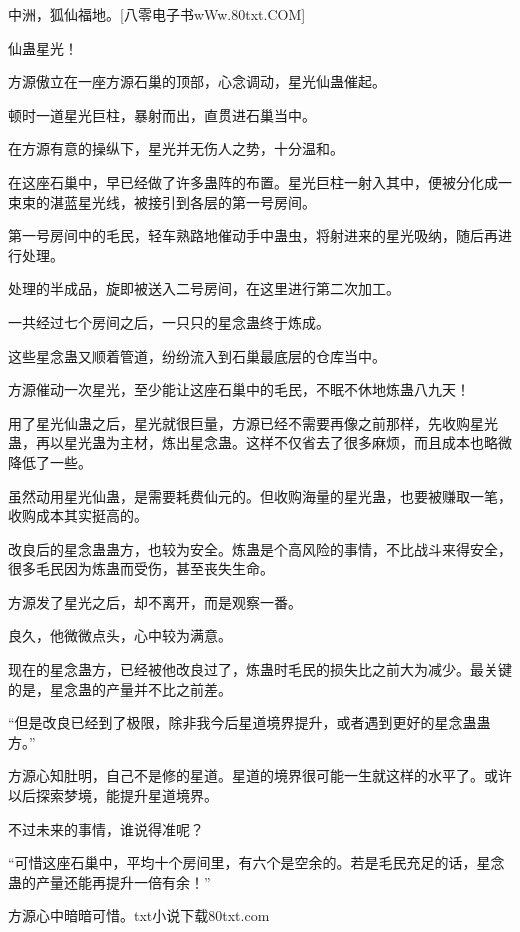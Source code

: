 
\begin{this_body}

中洲，狐仙福地。[八零电子书wWw.80txt.COM]

仙蛊星光！

方源傲立在一座方源石巢的顶部，心念调动，星光仙蛊催起。

顿时一道星光巨柱，暴射而出，直贯进石巢当中。

在方源有意的操纵下，星光并无伤人之势，十分温和。

在这座石巢中，早已经做了许多蛊阵的布置。星光巨柱一射入其中，便被分化成一束束的湛蓝星光线，被接引到各层的第一号房间。

第一号房间中的毛民，轻车熟路地催动手中蛊虫，将射进来的星光吸纳，随后再进行处理。

处理的半成品，旋即被送入二号房间，在这里进行第二次加工。

一共经过七个房间之后，一只只的星念蛊终于炼成。

这些星念蛊又顺着管道，纷纷流入到石巢最底层的仓库当中。

方源催动一次星光，至少能让这座石巢中的毛民，不眠不休地炼蛊八九天！

用了星光仙蛊之后，星光就很巨量，方源已经不需要再像之前那样，先收购星光蛊，再以星光蛊为主材，炼出星念蛊。这样不仅省去了很多麻烦，而且成本也略微降低了一些。

虽然动用星光仙蛊，是需要耗费仙元的。但收购海量的星光蛊，也要被赚取一笔，收购成本其实挺高的。

改良后的星念蛊蛊方，也较为安全。炼蛊是个高风险的事情，不比战斗来得安全，很多毛民因为炼蛊而受伤，甚至丧失生命。

方源发了星光之后，却不离开，而是观察一番。

良久，他微微点头，心中较为满意。

现在的星念蛊方，已经被他改良过了，炼蛊时毛民的损失比之前大为减少。最关键的是，星念蛊的产量并不比之前差。

“但是改良已经到了极限，除非我今后星道境界提升，或者遇到更好的星念蛊蛊方。”

方源心知肚明，自己不是修的星道。星道的境界很可能一生就这样的水平了。或许以后探索梦境，能提升星道境界。

不过未来的事情，谁说得准呢？

“可惜这座石巢中，平均十个房间里，有六个是空余的。若是毛民充足的话，星念蛊的产量还能再提升一倍有余！”

方源心中暗暗可惜。txt小说下载80txt.com


\end{this_body}
